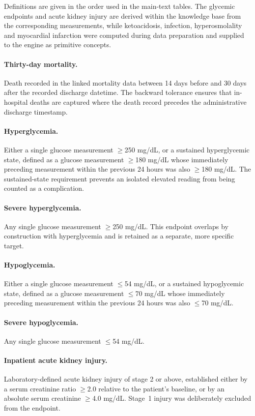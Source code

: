 \documentclass[11pt,a4paper]{article}
\begin{document}
Definitions are given in the order used in the main-text tables. The glycemic
endpoints and acute kidney injury are derived within the knowledge base from
the corresponding measurements, while ketoacidosis, infection,
hyperosmolality and myocardial infarction were computed during data
preparation and supplied to the engine as primitive concepts.

\paragraph{Thirty-day mortality.}
Death recorded in the linked mortality data between 14 days before and 30
days after the recorded discharge datetime. The backward tolerance ensures
that in-hospital deaths are captured where the death record precedes the
administrative discharge timestamp.

\paragraph{Hyperglycemia.}
Either a single glucose measurement $\geq$250 mg/dL, or a sustained
hyperglycemic state, defined as a glucose measurement $\geq$180 mg/dL whose
immediately preceding measurement within the previous 24 hours was also
$\geq$180 mg/dL. The sustained-state requirement prevents an isolated
elevated reading from being counted as a complication.

\paragraph{Severe hyperglycemia.}
Any single glucose measurement $\geq$250 mg/dL. This endpoint overlaps by
construction with hyperglycemia and is retained as a separate, more specific
target.

\paragraph{Hypoglycemia.}
Either a single glucose measurement $\leq$54 mg/dL, or a sustained
hypoglycemic state, defined as a glucose measurement $\leq$70 mg/dL whose
immediately preceding measurement within the previous 24 hours was also
$\leq$70 mg/dL.

\paragraph{Severe hypoglycemia.}
Any single glucose measurement $\leq$54 mg/dL.

\paragraph{Inpatient acute kidney injury.}
Laboratory-defined acute kidney injury of stage 2 or above, established
either by a serum creatinine ratio $\geq$2.0 relative to the patient's
baseline, or by an absolute serum creatinine $\geq$4.0 mg/dL. Stage~1 injury
was deliberately excluded from the endpoint.
\end{document}
